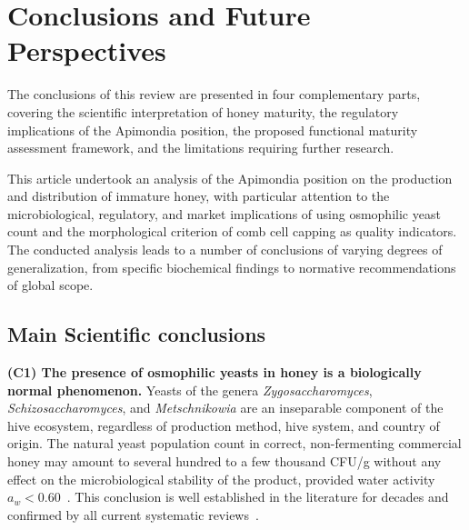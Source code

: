 
\section{Conclusions and Future Perspectives}

The conclusions of this review are presented in four complementary parts, covering the scientific interpretation of honey maturity, the regulatory implications of the Apimondia position, the proposed functional maturity assessment framework, and the limitations requiring further research.

This article undertook an analysis of the Apimondia position
on the production and distribution of immature honey, with
particular attention to the microbiological, regulatory, and
market implications of using osmophilic yeast count and the
morphological criterion of comb cell capping as quality indicators.
The conducted analysis leads to a number of conclusions of varying
degrees of generalization, from specific biochemical findings
to normative recommendations of global scope.

\subsection{Main Scientific conclusions}

\textbf{(C1) The presence of osmophilic yeasts in honey is a biologically normal phenomenon.}
Yeasts of the genera \textit{Zygosaccharomyces}, \textit{Schizosaccharomyces},
and \textit{Metschnikowia} are an inseparable component of the hive
ecosystem, regardless of production method, hive system, and country
of origin. The natural yeast population count in correct, non-fermenting
commercial honey may amount to several hundred to a few thousand CFU/g
without any effect on the microbiological stability of the product,
provided water activity $a_w < 0.60$~\cite{ruegg1981}.
This conclusion is well established in the literature for decades
and confirmed by all current systematic
reviews~\cite{biochemreactions2022,rodriguezmachado2024}.


